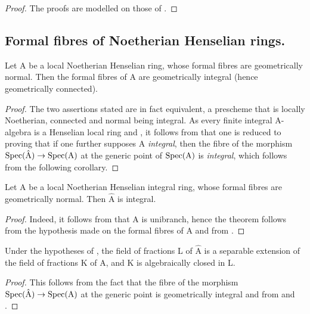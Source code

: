 \begin{proof}
The proofs are modelled on those of .
\end{proof}


\subsection{Formal fibres of Noetherian Henselian rings.}
\label{subsection:IV.18.9}

\begin{theorem}[18.9.1]
\label{IV.18.9.1}
Let $\mathrm{A}$ be a local Noetherian Henselian ring, whose formal fibres are geometrically normal.
Then the formal fibres of $\mathrm{A}$ are geometrically integral (hence geometrically connected).
\end{theorem}

\begin{proof}
The two assertions stated are in fact equivalent, a prescheme that is locally Noetherian, connected and normal being integral.
As every finite integral A-algebra is a Henselian local ring  and , it follows from  that one is reduced to proving that if one further supposes A \emph{integral}, then the fibre of the morphism $\operatorname{Spec}(\hat{\mathrm{A}})\to\operatorname{Spec}(\mathrm{A})$ at the generic point of $\operatorname{Spec}(\mathrm{A})$ is \emph{integral}, which follows from the following corollary.
\end{proof}

\begin{corollary}[18.9.2]
\label{IV.18.9.2}
Let $\mathrm{A}$ be a local Noetherian Henselian integral ring, whose formal fibres are geometrically normal.
Then $\hat{\mathrm{A}}$ is integral.
\end{corollary}

\begin{proof}
Indeed, it follows from  that A is unibranch, hence the theorem follows from the hypothesis made on the formal fibres of A and from .
\end{proof}

\begin{corollary}[18.9.3]
\label{IV.18.9.3}
Under the hypotheses of , the field of fractions L of $\hat{\mathrm{A}}$ is a separable extension of the field of fractions K of A, and K is algebraically closed in L.
\end{corollary}

\begin{proof}
This follows from the fact that the fibre of the morphism $\operatorname{Spec}(\hat{\mathrm{A}})\to\operatorname{Spec}(\mathrm{A})$ at the generic point is geometrically integral and from  and .
\end{proof}

